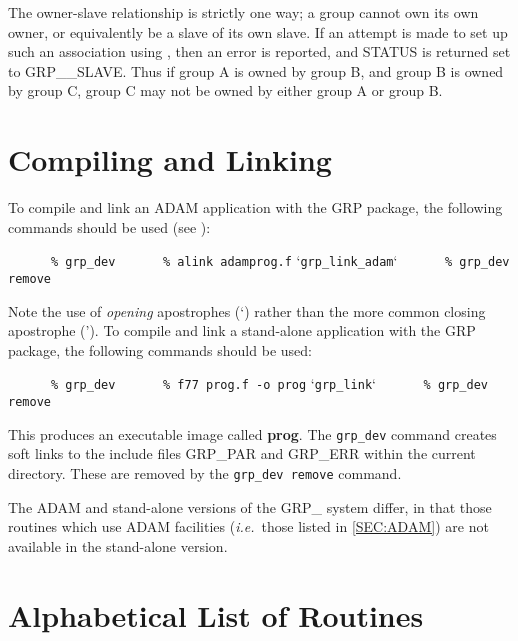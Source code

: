 The owner-slave relationship is strictly one way; a group cannot own its own
owner, or equivalently be a slave of its own slave. If an attempt is
made to set up such an association using , then an error is reported,
and STATUS is returned set to GRP\_\_SLAVE. Thus if group A is owned by group B,
and group B is owned by group C, group C may not be owned by either group A or
group B.

\section{Compiling and Linking}
To compile and link an ADAM application with the GRP package, the following
commands should be used (see ):

\small
\verb#      % grp_dev#
\verb#      % alink adamprog.f# `\verb#grp_link_adam#`
\verb#      % grp_dev remove#
\normalsize

Note the use of {\em opening} apostrophes (`) rather than the more common
closing apostrophe ('). To compile and link a stand-alone application with
the GRP package, the following commands should be used:

\small
\verb#      % grp_dev#
\verb#      % f77 prog.f -o prog# `\verb#grp_link#`
\verb#      % grp_dev remove#
\normalsize

This produces an executable image called {\bf prog}. The \verb+grp_dev+
command creates soft links to the include files GRP\_PAR and GRP\_ERR
within the current directory. These are removed by the \verb+grp_dev remove+ command.

The ADAM and stand-alone versions of the GRP\_ system differ, in that those
routines which use ADAM facilities ({\em i.e.}\ those listed in
\ref{SEC:ADAM}) are not available in the stand-alone version.

\appendix
\section{Alphabetical List of Routines}


\newcommand{\noteroutine}[3]{{\small \bf {#1}{#2}} \nopagebreak \\
                             \hspace*{3em} {\em {#3}} \\[1.5ex]}



